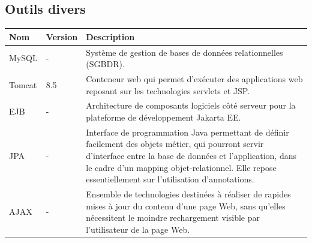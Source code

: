 \subsection{\textbf{Outils divers}}
\noindent
\begin{tabular}{!{\color{white}\vrule}m{3.4cm}!{\color{white}\vrule}m{1.7cm}!{\color{white}\vrule}m{10.8cm}!{\color{white}\vrule}}


\hline
 \color{white} Nom & \color{white} Version & \color{white} Description\\

\hline
{} MySQL & - & Système de gestion de bases de données relationnelles (SGBDR). \\

\hline
{} Tomcat & 8.5 & Conteneur web qui permet d'exécuter des applications web reposant sur les technologies servlets et JSP. \\

\hline
{} EJB & - & Architecture de composants logiciels côté serveur pour la plateforme de développement Jakarta EE. \\

\hline
{} JPA & - & Interface de programmation Java permettant de définir facilement des objets métier, qui pourront servir d'interface entre la base de données et l'application, dans le cadre d'un mapping objet-relationnel. Elle repose essentiellement sur l'utilisation d'annotations.  \\

\hline
{} AJAX & - & Ensemble de technologies destinées à réaliser de rapides mises à jour du contenu d'une page Web, sans qu'elles nécessitent le moindre rechargement visible par l'utilisateur de la page Web. \\

\hline

\end{tabular}

